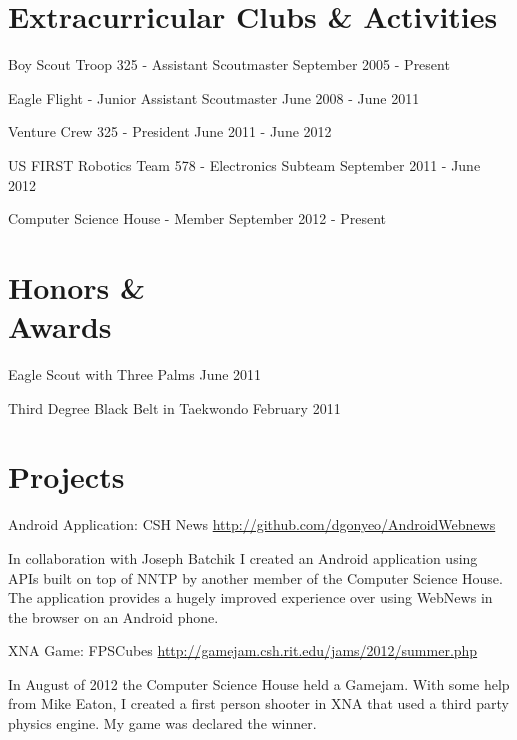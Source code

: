 \documentclass[letterpaper,margin,line,11pt]{resume}
\newcommand{\rurl}[1]{\hfill {\footnotesize \url{#1}}}
\begin{document}
\begin{resume}
\section{\mysidestyle Extracurricular Clubs \& Activities}
	\begin{asparablank}
		\item Boy Scout Troop 325 - {\small Assistant Scoutmaster} \hfill September 2005 - Present
		\item Eagle Flight - {\small Junior Assistant Scoutmaster} \hfill June 2008 - June 2011
		\item Venture Crew 325 - {\small President} \hfill June 2011 - June 2012
		\item US FIRST Robotics Team 578 - {\small Electronics Subteam} \hfill September 2011 - June 2012
		\item Computer Science House - Member \hfill September 2012 - Present
	\end{asparablank}

\section{\mysidestyle Honors \& \\ Awards}
	\begin{asparablank}
		\item Eagle Scout with Three Palms \hfill June 2011
		\item Third Degree Black Belt in Taekwondo \hfill February 2011
	\end{asparablank}

\section{\mysidestyle Projects}
	\begin{compactdesc}
		\item[Android Application: CSH News] \rurl{http://github.com/dgonyeo/AndroidWebnews}
			\item In collaboration with Joseph Batchik I created an Android application using APIs built on top of NNTP by another member of the Computer Science House. The application provides a hugely improved experience over using WebNews in the browser on an Android phone.
                \item[XNA Game: FPSCubes] \rurl{http://gamejam.csh.rit.edu/jams/2012/summer.php}
			\item In August of 2012 the Computer Science House held a Gamejam. With some help from Mike Eaton, I created a first person shooter in XNA that used a third party physics engine. My game was declared the winner.
	\end{compactdesc}
\end{resume}
\end{document}
